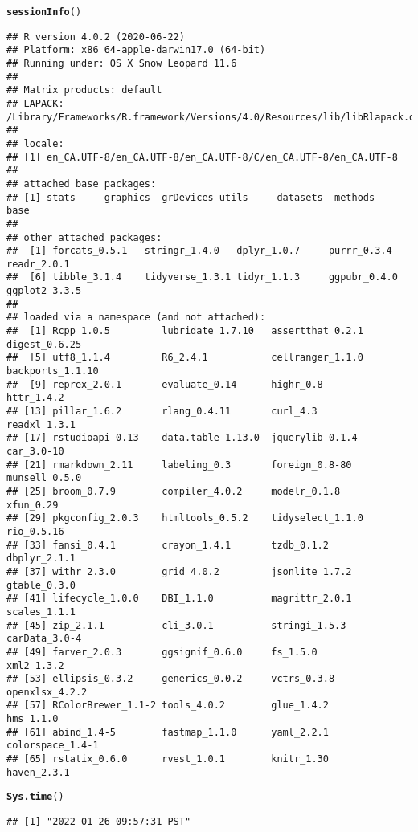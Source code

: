 \documentclass{article}\usepackage[]{graphicx}\usepackage[]{color}
\makeatletter
\newcommand{\hlstd}[1]{\textcolor[rgb]{0.345,0.345,0.345}{#1}}%
\newcommand{\hlkwd}[1]{\textcolor[rgb]{0.737,0.353,0.396}{\textbf{#1}}}%
\newenvironment{kframe}{%
 \def\at@end@of@kframe{}%
 \ifinner\ifhmode%
  \def\at@end@of@kframe{\end{minipage}}%
  \begin{minipage}{\columnwidth}%
 \fi\fi%
 \def\FrameCommand##1{\hskip\@totalleftmargin \hskip-\fboxsep
 \colorbox{shadecolor}{##1}\hskip-\fboxsep
     \hskip-\linewidth \hskip-\@totalleftmargin \hskip\columnwidth}%
 \MakeFramed {\advance\hsize-\width
   \@totalleftmargin\z@ \linewidth\hsize
   \@setminipage}}%
 {\par\unskip\endMakeFramed%
 \at@end@of@kframe}
\newenvironment{knitrout}{}{} %
\makeatother
\begin{document}
\begin{knitrout}
\color{fgcolor}\begin{kframe}
\begin{alltt}
\hlkwd{sessionInfo}\hlstd{()}
\end{alltt}
\begin{verbatim}
## R version 4.0.2 (2020-06-22)
## Platform: x86_64-apple-darwin17.0 (64-bit)
## Running under: OS X Snow Leopard 11.6
## 
## Matrix products: default
## LAPACK: /Library/Frameworks/R.framework/Versions/4.0/Resources/lib/libRlapack.dylib
## 
## locale:
## [1] en_CA.UTF-8/en_CA.UTF-8/en_CA.UTF-8/C/en_CA.UTF-8/en_CA.UTF-8
## 
## attached base packages:
## [1] stats     graphics  grDevices utils     datasets  methods   base     
## 
## other attached packages:
##  [1] forcats_0.5.1   stringr_1.4.0   dplyr_1.0.7     purrr_0.3.4     readr_2.0.1    
##  [6] tibble_3.1.4    tidyverse_1.3.1 tidyr_1.1.3     ggpubr_0.4.0    ggplot2_3.3.5  
## 
## loaded via a namespace (and not attached):
##  [1] Rcpp_1.0.5         lubridate_1.7.10   assertthat_0.2.1   digest_0.6.25     
##  [5] utf8_1.1.4         R6_2.4.1           cellranger_1.1.0   backports_1.1.10  
##  [9] reprex_2.0.1       evaluate_0.14      highr_0.8          httr_1.4.2        
## [13] pillar_1.6.2       rlang_0.4.11       curl_4.3           readxl_1.3.1      
## [17] rstudioapi_0.13    data.table_1.13.0  jquerylib_0.1.4    car_3.0-10        
## [21] rmarkdown_2.11     labeling_0.3       foreign_0.8-80     munsell_0.5.0     
## [25] broom_0.7.9        compiler_4.0.2     modelr_0.1.8       xfun_0.29         
## [29] pkgconfig_2.0.3    htmltools_0.5.2    tidyselect_1.1.0   rio_0.5.16        
## [33] fansi_0.4.1        crayon_1.4.1       tzdb_0.1.2         dbplyr_2.1.1      
## [37] withr_2.3.0        grid_4.0.2         jsonlite_1.7.2     gtable_0.3.0      
## [41] lifecycle_1.0.0    DBI_1.1.0          magrittr_2.0.1     scales_1.1.1      
## [45] zip_2.1.1          cli_3.0.1          stringi_1.5.3      carData_3.0-4     
## [49] farver_2.0.3       ggsignif_0.6.0     fs_1.5.0           xml2_1.3.2        
## [53] ellipsis_0.3.2     generics_0.0.2     vctrs_0.3.8        openxlsx_4.2.2    
## [57] RColorBrewer_1.1-2 tools_4.0.2        glue_1.4.2         hms_1.1.0         
## [61] abind_1.4-5        fastmap_1.1.0      yaml_2.2.1         colorspace_1.4-1  
## [65] rstatix_0.6.0      rvest_1.0.1        knitr_1.30         haven_2.3.1
\end{verbatim}
\begin{alltt}
\hlkwd{Sys.time}\hlstd{()}
\end{alltt}
\begin{verbatim}
## [1] "2022-01-26 09:57:31 PST"
\end{verbatim}
\end{kframe}
\end{knitrout}
\end{document}
